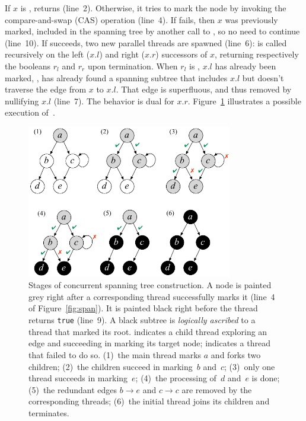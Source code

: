 If $x$ is ,  returns 
(line~2). Otherwise, it tries to mark the node by invoking the
compare-and-swap (CAS) operation (line~4). If  fails, then
$x$ was previously marked, \ie included in the spanning tree by
another call to , so no need to continue (line~10). If
 succeeds, two new parallel threads are spawned (line~6):
 is called recursively on the left ($x.l$) and right
($x.r$) successors of $x$, returning respectively the booleans $r_l$
and $r_r$ upon termination. When $r_l$ is , $x.l$ has
already been marked, \ie,  has already found a spanning
subtree that includes $x.l$ but doesn't traverse the edge from $x$ to
$x.l$. That edge is superfluous, and thus removed by nullifying $x.l$
(line~7). The behavior is dual for $x.r$. Figure~\ref{fig:stages}
illustrates a possible execution of~.


{
\setlength{\belowcaptionskip}{-10pt} 
\begin{figure}[t]
\centering
\includegraphics[width=0.8\textwidth]{stages.pdf}
\caption{Stages of concurrent spanning tree construction. A node is
  painted grey right after a corresponding thread successfully marks
  it (line~4 of Figure~\ref{fig:span}). It is painted black right
  before the thread returns \texttt{true} (line~9). A black subtree is
  \emph{logically ascribed} to a thread that marked its
  root. \textcolor{OliveGreen}{\cmark} indicates a child thread
  exploring an edge and succeeding in marking its target node;
  \textcolor{red}{\xmark} indicates a thread that failed to do
  so. (1)~the main thread marks $a$ and forks two children; (2)~the
  children succeed in marking~$b$ and~$c$; (3)~only one thread
  succeeds in marking~$e$; (4)~the processing of~$d$ and~$e$ is done;
  (5)~the redundant edges $b \rightarrow e$ and $c \rightarrow c$ are
  removed by the corresponding threads; (6)~the initial thread joins
  its children and terminates.}
\label{fig:stages}
\end{figure}
}

